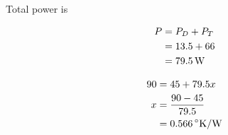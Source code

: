 \subsection{}

Total power is

\begin{align*}
P & = P_D + P_T \\
  & = 13.5 + 66\\
  & = \unit[79.5]{W}
\end{align*}


\begin{center}

\end{center}

\begin{align*}
90 & = 45 + 79.5 x \\
x & = \frac{90-45}{79.5}  \\
  & = \unit[0.566]{^\circ{}K/W}
\end{align*}